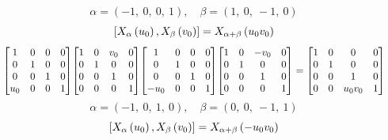 \documentclass[11pt]{article}
\theoremstyle{definition}
\begin{document}
\[
\alpha = \left( -1, \  0, \  0, \  1\right), \quad \beta = \left( 1, \  0, \  -1, \  0\right)
\]
\[
\scaletoalign{\textwidth}{\left[ X_{\alpha}\left(u_{0}\right), X_{\beta}\left(v_{0}\right) \right] = X_{\alpha + \beta}\left(u_{0} v_{0}\right)}
\]
\[
\scaletoalign{\textwidth}{{\left[\begin{matrix}1 & 0 & 0 & 0\\0 & 1 & 0 & 0\\0 & 0 & 1 & 0\\u_{0} & 0 & 0 & 1\end{matrix}\right]} {\left[\begin{matrix}1 & 0 & v_{0} & 0\\0 & 1 & 0 & 0\\0 & 0 & 1 & 0\\0 & 0 & 0 & 1\end{matrix}\right]} {\left[\begin{matrix}1 & 0 & 0 & 0\\0 & 1 & 0 & 0\\0 & 0 & 1 & 0\\- u_{0} & 0 & 0 & 1\end{matrix}\right]} {\left[\begin{matrix}1 & 0 & - v_{0} & 0\\0 & 1 & 0 & 0\\0 & 0 & 1 & 0\\0 & 0 & 0 & 1\end{matrix}\right]} = {\left[\begin{matrix}1 & 0 & 0 & 0\\0 & 1 & 0 & 0\\0 & 0 & 1 & 0\\0 & 0 & u_{0} v_{0} & 1\end{matrix}\right]}}
\]
\[
\alpha = \left( -1, \  0, \  1, \  0\right), \quad \beta = \left( 0, \  0, \  -1, \  1\right)
\]
\[
\scaletoalign{\textwidth}{\left[ X_{\alpha}\left(u_{0}\right), X_{\beta}\left(v_{0}\right) \right] = X_{\alpha + \beta}\left(- u_{0} v_{0}\right)}
\]
\end{document}
